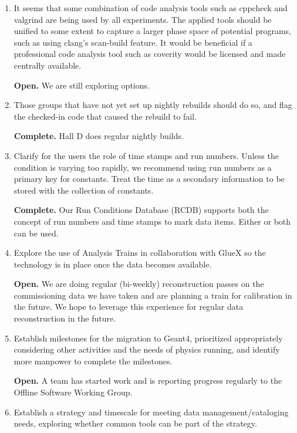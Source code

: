 \documentclass[12pt]{article}
\begin{document}
\begin{enumerate}

\item It seems that some combination of code analysis tools such as
  cppcheck and valgrind are being used by all experiments. The applied
  tools should be unified to some extent to capture a larger phase
  space of potential programs, such as using clang's scan-build
  feature. It would be beneficial if a professional code analysis tool
  such as coverity would be licensed and made centrally available.

  {\bf Open.} We are still exploring options.

\item Those groups that have not yet set up nightly rebuilds should do
  so, and flag the checked-in code that caused the rebuild to fail.

  {\bf Complete.} Hall D does regular nightly builds.

\item Clarify for the users the role of time stamps and run
  numbers. Unless the condition is varying too rapidly, we recommend
  using run numbers as a primary key for constants. Treat the time as
  a secondary information to be stored with the collection of
  constants.

  {\bf Complete.} Our Run Conditions Database (RCDB) supports both the
  concept of run numbers and time stamps to mark data items. Either or
  both can be used.

\item Explore the use of Analysis Trains in collaboration with GlueX
  so the technology is in place once the data becomes available.

  {\bf Open.} We are doing regular (bi-weekly) reconstruction passes
  on the commissioning data we have taken and are planning a train for
  calibration in the future. We hope to leverage this experience for
  regular data reconstruction in the future.

\item Establish milestones for the migration to Geant4, prioritized
  appropriately considering other activities and the needs of physics
  running, and identify more manpower to complete the milestones.

  {\bf Open.} A team has started work and is reporting progress
  regularly to the Offline Software Working Group.

\item Establish a strategy and timescale for meeting data
  management/cataloging needs, exploring whether common tools can be
  part of the strategy.


\end{enumerate}
\end{document}
